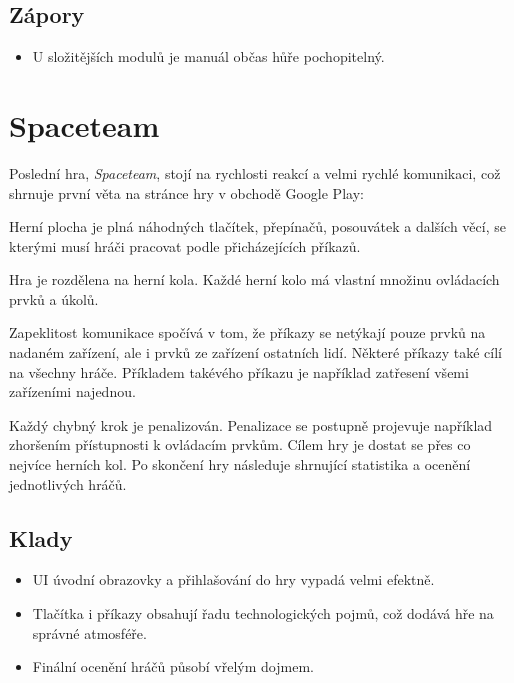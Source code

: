 \subsection*{Zápory}

\begin{itemize}
    \item U složitějších modulů je manuál občas hůře pochopitelný.
\end{itemize}

\section{Spaceteam}

Poslední hra, \emph{Spaceteam}, stojí na rychlosti reakcí a velmi rychlé
komunikaci, což shrnuje první věta na stránce hry \cite{henrysmithinc_spaceteam}
v obchodě Google Play: 

Herní plocha je plná náhodných tlačítek, přepínačů, posouvátek a dalších věcí,
se kterými musí hráči pracovat podle přicházejících příkazů.

Hra je rozdělena na herní kola.
Každé herní kolo má vlastní množinu ovládacích prvků a úkolů.

Zapeklitost komunikace spočívá v tom,
že příkazy se netýkají pouze prvků na nadaném zařízení,
ale i prvků ze zařízení ostatních lidí.
Některé příkazy také cílí na všechny hráče.
Příkladem takévého příkazu je například zatřesení všemi zařízeními najednou.

Každý chybný krok je penalizován.
Penalizace se postupně projevuje například zhoršením přístupnosti k ovládacím
prvkům.
Cílem hry je dostat se přes co nejvíce herních kol.
Po skončení hry následuje shrnující statistika a ocenění jednotlivých hráčů.

\FloatBarrier

\subsection*{Klady}

\begin{itemize}
    \item UI úvodní obrazovky a přihlašování do hry vypadá velmi efektně.
    \item Tlačítka i příkazy obsahují řadu technologických pojmů,
což dodává hře na správné atmosféře.
    \item Finální ocenění hráčů působí vřelým dojmem.
\end{itemize}

